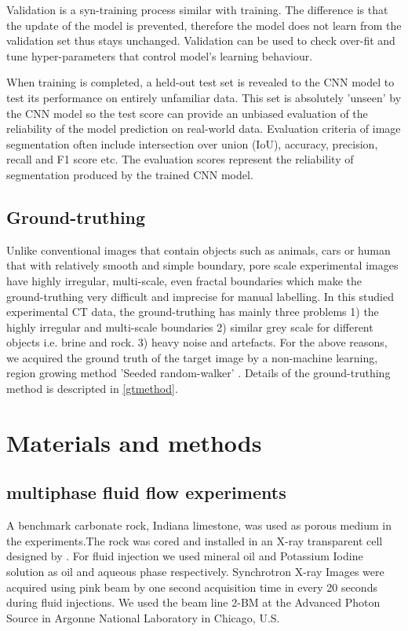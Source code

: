 \documentclass[draft,linenumbers]{agujournal2018}
\begin{document}
Validation is a syn-training process similar with training. The difference is that the update of the model is prevented, therefore the model does not learn from the validation set thus stays unchanged. Validation can be used to check over-fit and tune hyper-parameters that control model's learning behaviour. 

When training is completed, a held-out test set is revealed to the CNN model to test its performance on entirely unfamiliar data. This set is absolutely 'unseen' by the CNN model so the test score can provide an unbiased evaluation of the reliability of the model prediction on real-world data. Evaluation criteria of image segmentation often include intersection over union (IoU), accuracy, precision, recall and F1 score etc. The evaluation scores represent the reliability of segmentation produced by the trained CNN model.

\subsection{Ground-truthing}\label{gtintro}
Unlike conventional images that contain objects such as animals, cars or human that with relatively smooth and simple boundary, pore scale experimental images have highly irregular, multi-scale, even fractal boundaries which make the ground-truthing very difficult and imprecise for manual labelling. In this studied experimental CT data, the ground-truthing has mainly three problems 1) the highly irregular and multi-scale boundaries 2) similar grey scale for different objects i.e. brine and rock. 3) heavy noise and artefacts. For the above reasons, we acquired the ground truth of the target image by a non-machine learning, region growing method 'Seeded random-walker' \citep{grady2006random}. Details of the ground-truthing method is descripted in \ref{gtmethod}.

\section{Materials and methods}
\subsection{multiphase fluid flow experiments}
A benchmark carbonate rock, Indiana limestone, was used as porous medium in the experiments.The rock was cored and installed in an X-ray transparent cell designed by \citet{fusseis2014low}. For fluid injection we used mineral oil and Potassium Iodine solution as oil and aqueous phase respectively. Synchrotron X-ray Images were acquired using pink beam by one second acquisition time in every 20 seconds during fluid injections. We used the beam line 2-BM at the Advanced Photon Source in Argonne National Laboratory in Chicago, U.S.
\end{document}
